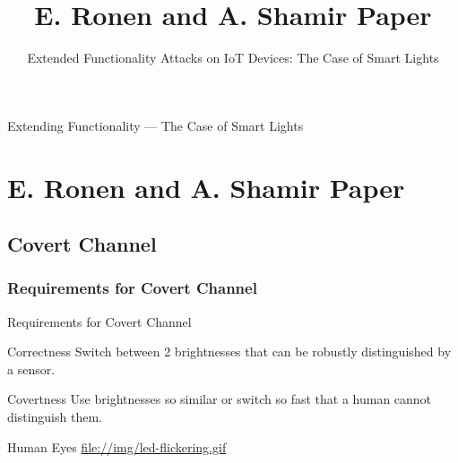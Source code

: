 \documentclass[11pt,t,usepdftitle=false,aspectratio=169]{beamer}
\begin{document}
\begin{frame}{Extending Functionality --- The Case of Smart Lights}
\end{frame}

\title{E. Ronen and A. Shamir Paper}
\subtitle{Extended Functionality Attacks on IoT Devices: The Case of Smart Lights}
\section{E. Ronen and A. Shamir Paper}

\subsection{Covert Channel}%
\label{sub:covert_channel}

\subsubsection{Requirements for Covert Channel}%
\label{sub:requirements_for_covert_channel}
\begin{frame}{Requirements for Covert Channel}
	\begin{block}{Correctness}
		Switch between 2 brightnesses that can be robustly distinguished by a sensor.
	\end{block}
	\begin{block}{Covertness}
		Use brightnesses so similar or switch so fast that a human cannot distinguish them.
	\end{block}
	\begin{block}{Human Eyes}
	    \url{file://img/led-flickering.gif}
	\end{block}
\end{frame}
\end{document}
